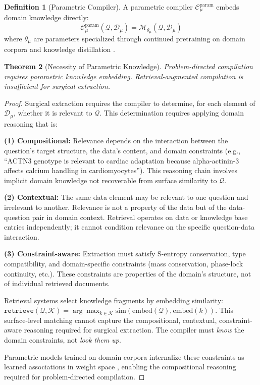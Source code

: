 \documentclass[10pt,twocolumn]{article}
\newtheorem{theorem}{Theorem}[section]
\theoremstyle{definition}
\newtheorem{definition}[theorem]{Definition}
\theoremstyle{remark}
\newcommand{\question}{\mathcal{Q}}
\newcommand{\dataset}{\mathcal{D}}
\newcommand{\model}{\mathcal{M}}
\newcommand{\params}{\theta}
\begin{document}
\begin{definition}[Parametric Compiler]
A parametric compiler $\mathcal{C}_\mu^{\text{param}}$ embeds domain knowledge directly:
\begin{equation}
\mathcal{C}_\mu^{\text{param}}(\question, \dataset_\mu) = \model_{\params_\mu}(\question, \dataset_\mu)
\end{equation}
where $\params_\mu$ are parameters specialized through continued pretraining on domain corpora and knowledge distillation \cite{hinton2015,gururangan2020}.
\end{definition}

\begin{theorem}[Necessity of Parametric Knowledge]
\label{thm:parametric_necessity}
Problem-directed compilation requires parametric knowledge embedding. Retrieval-augmented compilation is insufficient for surgical extraction.
\end{theorem}

\begin{proof}
Surgical extraction requires the compiler to determine, for each element of $\dataset_\mu$, whether it is relevant to $\question$. This determination requires applying domain reasoning that is:

\textbf{(1) Compositional:} Relevance depends on the interaction between the question's target structure, the data's content, and domain constraints (e.g., ``ACTN3 genotype is relevant to cardiac adaptation because alpha-actinin-3 affects calcium handling in cardiomyocytes''). This reasoning chain involves implicit domain knowledge not recoverable from surface similarity to $\question$.

\textbf{(2) Contextual:} The same data element may be relevant to one question and irrelevant to another. Relevance is not a property of the data but of the data-question pair in domain context. Retrieval operates on data or knowledge base entries independently; it cannot condition relevance on the specific question-data interaction.

\textbf{(3) Constraint-aware:} Extraction must satisfy S-entropy conservation, type compatibility, and domain-specific constraints (mass conservation, phase-lock continuity, etc.). These constraints are properties of the domain's structure, not of individual retrieved documents.

Retrieval systems select knowledge fragments by embedding similarity: $\texttt{retrieve}(\question, \mathcal{K}) = \arg\max_{k \in \mathcal{K}} \text{sim}(\text{embed}(\question), \text{embed}(k))$. This surface-level matching cannot capture the compositional, contextual, constraint-aware reasoning required for surgical extraction. The compiler must \emph{know} the domain constraints, not \emph{look them up}.

Parametric models trained on domain corpora internalize these constraints as learned associations in weight space \cite{gururangan2020}, enabling the compositional reasoning required for problem-directed compilation.
\end{proof}
\end{document}
